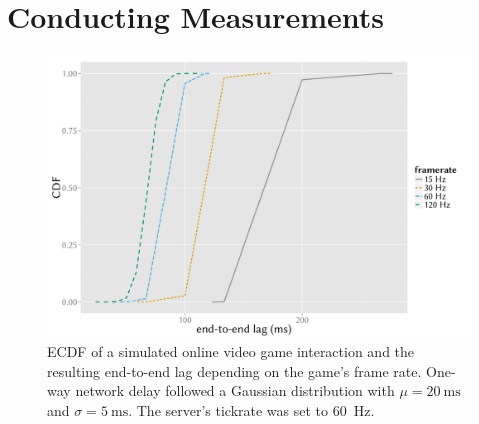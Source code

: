 \section{Conducting Measurements}
\label{sec:measurementgoals}


\begin{figure}[!t]
	\centering
	\includegraphics[width=1.0\columnwidth]{../simulation/visualization/matlab-framerate-lag.pdf}
	\caption{\acrshort{ECDF} of a simulated online video game interaction and the resulting end-to-end lag depending on the game's frame rate. One-way network delay followed a Gaussian distribution with $\mu = \SI{20}{\milli\second}$ and $\sigma = \SI{5}{\milli\second}$. The server's tickrate was set to \SI{60}{\hertz}.}
\label{fig:e2e-delay-sim}
\end{figure}



